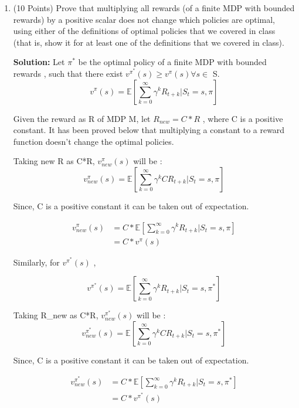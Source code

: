 \documentclass{article}
\begin{document}
\begin{enumerate}
\begin{tabular}{|c|c|c|c|c|}
\end{tabular} \\\\

    
    \item (10 Points) Prove that multiplying all rewards (of a finite MDP with bounded rewards) by a positive scalar does not change which policies are optimal, using either of the definitions of optimal policies that we covered in class (that is, show it for at least one of the definitions that we covered in class).
    
    \textbf{Solution:} Let $\pi^*$ be the optimal policy of a finite MDP with bounded rewards , such that there exist $v^{\pi^*}(s) \geq v^{\pi}(s) \forall s \in$ S. \\

   \[v^{\pi}(s) =\mathbb{E}[\sum_{k=0}^{\infty}{\gamma^k R_{t+k} | S_t = s, \pi}]\]	
   
   Given the reward as R of MDP M, let $R_{new} = C*R$ , where C is a positive constant. It has been proved below that multiplying a constant to a reward function doesn't change the optimal policies. 
   
   Taking new R as C*R, $v^{\pi}_{new}(s)$ will be :
   \[v^{\pi}_{new}(s) =\mathbb{E}[\sum_{k=0}^{\infty}{\gamma^k C R_{t+k} | S_t = s, \pi}]\]	
   
   Since, C is a positive constant it can be taken out of expectation.
   
   \begin{align}
   v^{\pi}_{new}(s) &=C*\mathbb{E}[\sum_{k=0}^{\infty}{\gamma^k R_{t+k} | S_t = s, \pi}]  \nonumber \\
			    &=C*v^{\pi}(s)
   \end{align}
   
   Similarly, for $v^{\pi^*}(s)$ , 
   
   \[v^{\pi^*}(s) =\mathbb{E}[\sum_{k=0}^{\infty}{\gamma^k R_{t+k} | S_t = s, \pi^*}]\]	
   
   Taking R_{new} as C*R, $v^{\pi^*}_{new}(s)$ will be :
   \[v^{\pi^*}_{new}(s) =\mathbb{E}[\sum_{k=0}^{\infty}{\gamma^k C R_{t+k} | S_t = s, \pi^*}]\]	
   
   Since, C is a positive constant it can be taken out of expectation.
   
   \begin{align}
   v^{\pi^*}_{new}(s) &=C*\mathbb{E}[\sum_{k=0}^{\infty}{\gamma^k R_{t+k} | S_t = s, \pi^*}] \nonumber \\
			       &=C*v^{\pi^*}(s)
   \end{align}
      

\end{enumerate}
\end{document}
